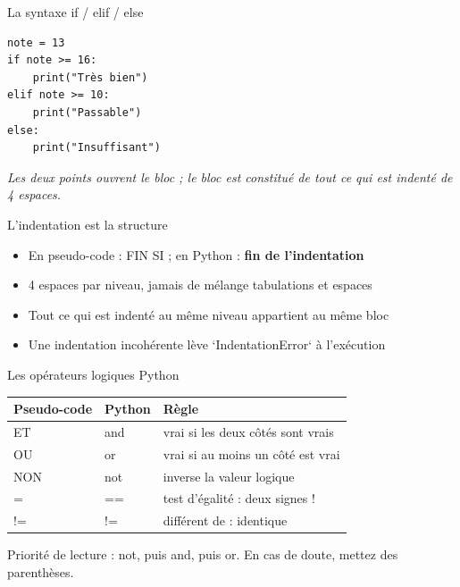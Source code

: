 \documentclass[aspectratio=169,11pt]{beamer}
\begin{document}
\begin{frame}[fragile]{La syntaxe if / elif / else}

\begin{lstlisting}[style=py]
note = 13
if note >= 16:
    print("Très bien")
elif note >= 10:
    print("Passable")
else:
    print("Insuffisant")
\end{lstlisting}
\vspace{0.5pt}

{\small\color{PyGris}\itshape Les deux points ouvrent le bloc ; le bloc est constitué de tout ce qui est indenté de 4 espaces.}

\end{frame}

\begin{frame}{L'indentation est la structure}
\begin{itemize}
  \item En pseudo-code : FIN SI ; en Python : \textbf{fin de l'indentation}
  \item 4 espaces par niveau, jamais de mélange tabulations et espaces
  \item Tout ce qui est indenté au même niveau appartient au même bloc
  \item Une indentation incohérente lève `IndentationError` à l'exécution
\end{itemize}
\end{frame}

\begin{frame}{Les opérateurs logiques Python}
\renewcommand{\arraystretch}{1.3}\small
\begin{center}
\begin{tabular}{lll}
\toprule
\textbf{\color{PyBleu}Pseudo-code} & \textbf{\color{PyBleu}Python} & \textbf{\color{PyBleu}Règle} \\
\midrule
ET & and & vrai si les deux côtés sont vrais \\
OU & or & vrai si au moins un côté est vrai \\
NON & not & inverse la valeur logique \\
= & == & test d'égalité : deux signes ! \\
!= & != & différent de : identique \\
\bottomrule
\end{tabular}
\end{center}

\vspace{4pt}

{\small\color{PyGris}Priorité de lecture : not, puis and, puis or. En cas de doute, mettez des parenthèses.}
\end{frame}
\end{document}
